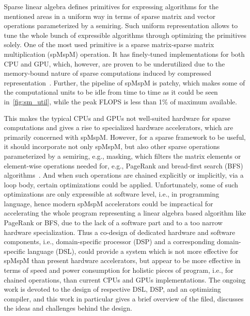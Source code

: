 \documentclass[10pt,conference]{IEEEtran}
\begin{document}
Sparse linear algebra defines primitives for expressing algorithms for the mentioned areas in a uniform way in terms of sparse matrix and vector operations parameterized by a semiring.
Such uniform representation allows to tune the whole bunch of expressible algorithms through optimizing the primitives solely.
One of the most used primitive is a sparse matrix-sparse matrix multiplication (spMspM) operation. 
It has finely-tuned implementations for both CPU and GPU, which, however, are proven to be underutilized due to the memory-bound nature of sparse computations induced by compressed representation~\cite{Florida,leskovec2016snap,Song_2016,zhang2020sparch}.
Further, the pipeline of spMspM is patchy, which makes some of the computational units to be idle from time to time as it could be seen in~\ref{fig:sm_util}, while the peak FLOPS is less than 1\% of maximum available. 


This makes the typical CPUs and GPUs not well-suited hardware for sparse computations and gives a rise to specialized hardware accelerators, which are primarily concerned with spMspM.
However, for a sparse framework to be useful, it should incorporate not only spMspM, but also other sparse operations parameterized by a semiring, e.g., masking, which filters the matrix elements or element-wise operations needed for, e.g., PageRank and bread-first search (BFS) algorithms~\cite{yang2020graphblast}.
And when such operations are chained explicitly or implicitly, via a loop body, certain optimizations could be applied. 
Unfortunately, some of such optimizations are only expressible at software level, i.e., in programming language, hence modern spMspM accelerators could be impractical for accelerating the whole program representing a linear algebra based algorithm like PageRank or BFS, due to the lack of a software part and to a too narrow hardware specialization.
Thus a co-design of dedicated hardware and software components, i.e., domain-specific processor (DSP) and a corresponding domain-specific language (DSL), could provide a system which is not more effective for spMspM than present hardware accelerators, but appear to be more effective in terms of speed and power consumption for holistic pieces of program, i.e., for chained operations, than current CPUs and GPUs implementations.
The ongoing work is devoted to the design of respective DSL, DSP, and an optimizing compiler, and this work in particular gives a brief overview of the filed, discusses the ideas and challenges behind the design. 
\end{document}

